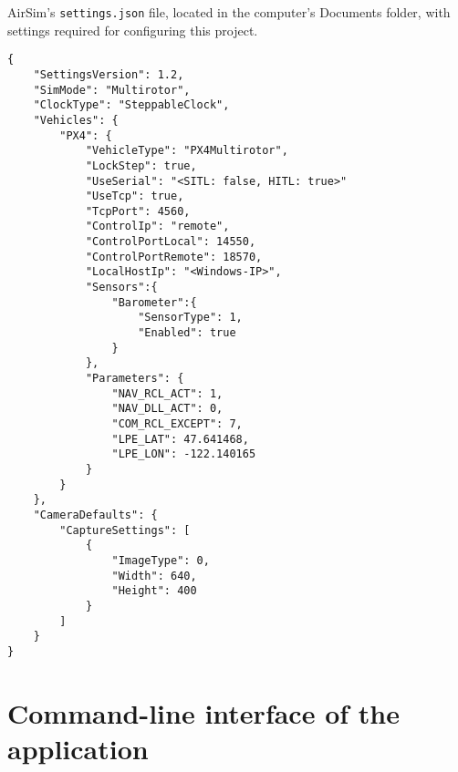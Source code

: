 \begin{listing}[h]
    \caption{AirSim's \texttt{settings.json} file, located in the computer's Documents folder, with settings required for configuring this project.}
    \label{lst:airsim-settings}
    \begin{verbatim}
{
    "SettingsVersion": 1.2,
    "SimMode": "Multirotor",
    "ClockType": "SteppableClock",
    "Vehicles": {
        "PX4": {
            "VehicleType": "PX4Multirotor",
            "LockStep": true,
            "UseSerial": "<SITL: false, HITL: true>"
            "UseTcp": true,
            "TcpPort": 4560,
            "ControlIp": "remote",
            "ControlPortLocal": 14550,
            "ControlPortRemote": 18570,
            "LocalHostIp": "<Windows-IP>",
            "Sensors":{
                "Barometer":{
                    "SensorType": 1,
                    "Enabled": true
                }
            },
            "Parameters": {
                "NAV_RCL_ACT": 1,
                "NAV_DLL_ACT": 0,
                "COM_RCL_EXCEPT": 7,
                "LPE_LAT": 47.641468,
                "LPE_LON": -122.140165
            }
        }
    },
    "CameraDefaults": {
        "CaptureSettings": [
            {
                "ImageType": 0,
                "Width": 640,
                "Height": 400
            }
        ]
    }
}
    \end{verbatim}
\end{listing}

\chapter{Command-line interface of the application}
\label{app:cli}

